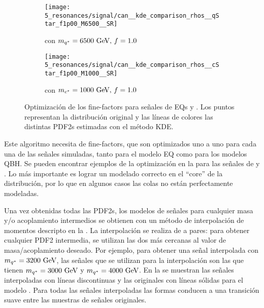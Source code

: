 \begin{figure}[ht!]
    \centering
    \begin{subfigure}[h]{0.49\linewidth}
        \centering
        \texttt{[image: 5\_resonances/signal/can\_\_kde\_comparison\_rhos\_\_qStar\_f1p00\_M6500\_\_SR]}
        \caption{\qstar con \(m_{q^*} = 6500~\text{GeV},\, f=1.0\)}
        \label{fig:signals:modeling:fine_factor_optimization_qstar}
    \end{subfigure}
    \begin{subfigure}[h]{0.49\linewidth}
        \centering
        \texttt{[image: 5\_resonances/signal/can\_\_kde\_comparison\_rhos\_\_cStar\_f1p00\_M1000\_\_SR]}
        \caption{\cstar con \(m_{c^*} = 1000~\text{GeV},\, f=1.0\)}
        \label{fig:signals:modeling:fine_factor_optimization_cstar}
    \end{subfigure}
    \caption{Optimización de los fine-factors para señales de \acp{EQ} \qstar y \cstar. Los puntos representan la distribución original y las líneas de colores las distintas \acp{PDF2} estimadas con el m\'etodo \ac{KDE}.}
    \label{fig:signals:modeling:fine_factor_optimization}
\end{figure}

Este algoritmo necesita de fine-factors, que son optimizados uno a uno para cada una de las señales simuladas, tanto para el modelo \ac{EQ} como para los modelos \ac{QBH}. Se pueden encontrar ejemplos de la optimización en la \Fig{\ref{fig:signals:modeling:fine_factor_optimization}} para las señales de \qstar y \cstar. Lo más importante es lograr un modelado correcto en el \enquote{core} de la distribución, por lo que en algunos casos las colas no están perfectamente modeladas.

Una vez obtenidas todas las \acp{PDF2}, los modelos de señales para cualquier masa y/o acoplamiento intermedios se obtienen con un método de interpolación de momentos descripto en la . La interpolación se realiza de a pares: para obtener cualquier \ac{PDF2} intermedia, se utilizan las dos más cercanas al valor de masa/acoplamiento deseado. Por ejemplo, para obtener una señal interpolada con \(m_{q^*} = 3200~\text{GeV}\), las señales que se utilizan para la interpolación son las que tienen \(m_{q^*} = 3000~\text{GeV}\) y \(m_{q^*} = 4000~\text{GeV}\).
En la \Fig{\ref{fig:signals:modeling:final_interpolation}} se muestran las señales interpoladas con líneas discontinuas y las originales con líneas sólidas para el modelo \qstar. Para todas las señales interpoladas las formas conducen a una transición suave entre las muestras de señales originales.


